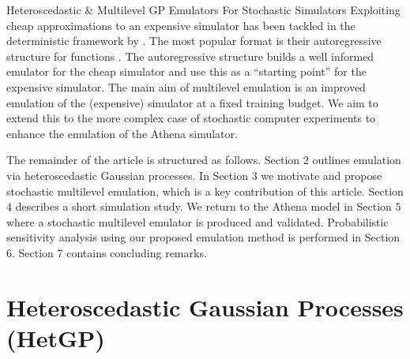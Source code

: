 \begin{chapter}{Heteroscedastic \& Multilevel GP Emulators For Stochastic Simulators\label{Ch:Hetsml}}
Exploiting cheap approximations to an expensive simulator has been tackled in the deterministic framework by \citet{Kennedy2000}. The most popular format is their autoregressive structure for functions \citep{Forrester2007, Singh2017, Harvey2018}. The autoregressive structure builds a well informed emulator for the cheap simulator and use this as a ``starting point'' for the expensive simulator. The main aim of multilevel emulation is an improved emulation of the (expensive) simulator at a fixed training budget. We aim to extend this to the more complex case of stochastic computer experiments to enhance the emulation of the Athena simulator.%

The remainder of the article is structured as follows. Section $2$ outlines emulation via heteroscedastic Gaussian processes. In Section $3$ we motivate and propose stochastic multilevel emulation, which is a key contribution of this article. Section $4$ describes a short simulation study. We return to the Athena model in Section $5$ where a stochastic multilevel emulator is produced and validated. Probabilistic sensitivity analysis using our proposed emulation method is performed in Section $6$. Section $7$ contains concluding remarks.

\section{Heteroscedastic Gaussian Processes (HetGP)}


\end{chapter}
